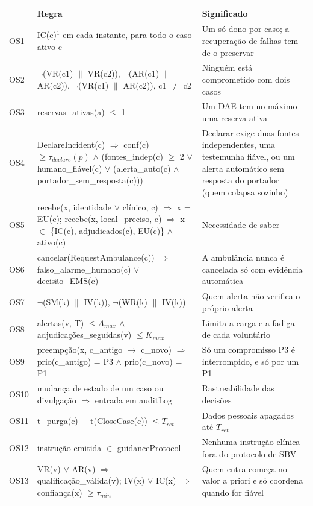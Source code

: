 \documentclass[10pt,a4paper]{article}
\begin{document}
{\small
\begin{xltabular}{\linewidth}{@{}lTL@{}}
\toprule
& \normalfont Regra & Significado \\
\midrule
\endhead
OS1 & IC(c)$^{1}$ em cada instante, para todo o caso ativo c & Um só dono por caso; a recuperação de falhas tem de o preservar \\
OS2 & $\neg$(VR(c1) $\parallel$ VR(c2)), $\neg$(AR(c1) $\parallel$ AR(c2)), $\neg$(VR(c1) $\parallel$ AR(c2)), c1 $\neq$ c2 & Ninguém está comprometido com dois casos \\
OS3 & reservas\_ativas(a) $\le$ 1 & Um DAE tem no máximo uma reserva ativa \\
OS4 & DeclareIncident(c) $\Rightarrow$ conf(c) $\ge \tau_{declare}(p)$ $\wedge$ (fontes\_indep(c) $\ge$ 2 $\vee$ humano\_fiável(c) $\vee$ (alerta\_auto(c) $\wedge$ portador\_sem\_resposta(c))) & Declarar exige duas fontes independentes, uma testemunha fiável, ou um alerta automático sem resposta do portador (quem colapsa sozinho) \\
OS5 & recebe(x, identidade $\vee$ clínico, c) $\Rightarrow$ x = EU(c); recebe(x, local\_preciso, c) $\Rightarrow$ x $\in$ \{IC(c), adjudicados(c), EU(c)\} $\wedge$ ativo(c) & Necessidade de saber \\
OS6 & cancelar(RequestAmbulance(c)) $\Rightarrow$ falso\_alarme\_humano(c) $\vee$ decisão\_EMS(c) & A ambulância nunca é cancelada só com evidência automática \\
OS7 & $\neg$(SM(k) $\parallel$ IV(k)), $\neg$(WR(k) $\parallel$ IV(k)) & Quem alerta não verifica o próprio alerta \\
OS8 & alertas(v, T) $\le A_{max}$ $\wedge$ adjudicações\_seguidas(v) $\le K_{max}$ & Limita a carga e a fadiga de cada voluntário \\
OS9 & preempção(x, c\_antigo $\rightarrow$ c\_novo) $\Rightarrow$ prio(c\_antigo) = P3 $\wedge$ prio(c\_novo) = P1 & Só um compromisso P3 é interrompido, e só por um P1 \\
OS10 & mudança de estado de um caso ou divulgação $\Rightarrow$ entrada em auditLog & Rastreabilidade das decisões \\
OS11 & t\_purga(c) $-$ t(CloseCase(c)) $\le T_{ret}$ & Dados pessoais apagados até $T_{ret}$ \\
OS12 & instrução emitida $\in$ guidanceProtocol & Nenhuma instrução clínica fora do protocolo de SBV \\
OS13 & VR(v) $\vee$ AR(v) $\Rightarrow$ qualificação\_válida(v); IV(x) $\vee$ IC(x) $\Rightarrow$ confiança(x) $\ge \tau_{min}$ & Quem entra começa no valor a priori e só coordena quando for fiável \\
\bottomrule
\end{xltabular}
}
\end{document}
